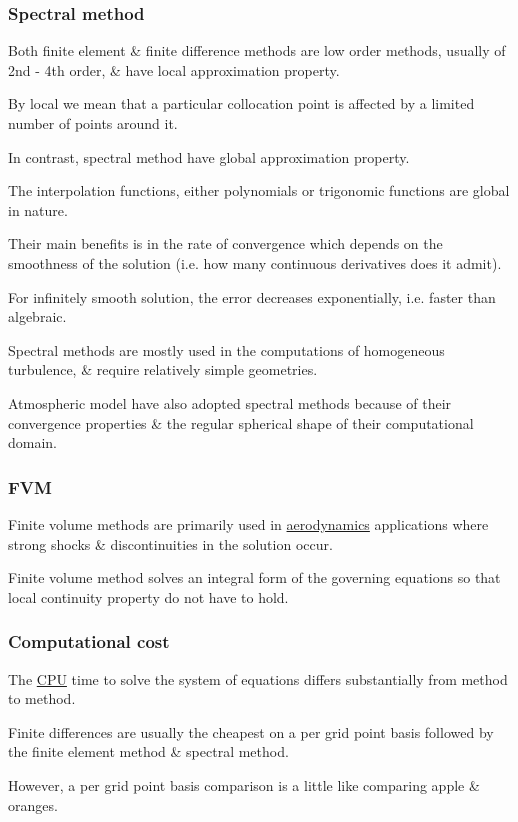 \documentclass{article}
\begin{document}
\subsubsection{Spectral method}
Both finite element \& finite difference methods are low order methods, usually of 2nd - 4th order, \& have local approximation property.

By local we mean that a particular collocation point is affected by a limited number of points around it.

In contrast, spectral method have global approximation property.

The interpolation functions, either polynomials or trigonomic functions are global in nature.

Their main benefits is in the rate of convergence which depends on the smoothness of the solution (i.e. how many continuous derivatives does it admit).

For infinitely smooth solution, the error decreases exponentially, i.e. faster than algebraic.

Spectral methods are mostly used in the computations of homogeneous turbulence, \& require relatively simple geometries.

Atmospheric model have also adopted spectral methods because of their convergence properties \& the regular spherical shape of their computational domain.

\subsubsection{FVM}
Finite volume methods are primarily used in \href{https://en.wikipedia.org/wiki/Aerodynamics}{aerodynamics} applications where strong shocks \& discontinuities in the solution occur.

Finite volume method solves an integral form of the governing equations so that local continuity property do not have to hold.

\subsubsection{Computational cost}
The \href{https://en.wikipedia.org/wiki/CPU}{CPU} time to solve the system of equations differs substantially from method to method.

Finite differences are usually the cheapest on a per grid point basis followed by the finite element method \& spectral method.

However, a per grid point basis comparison is a little like comparing apple \& oranges.
\end{document}
